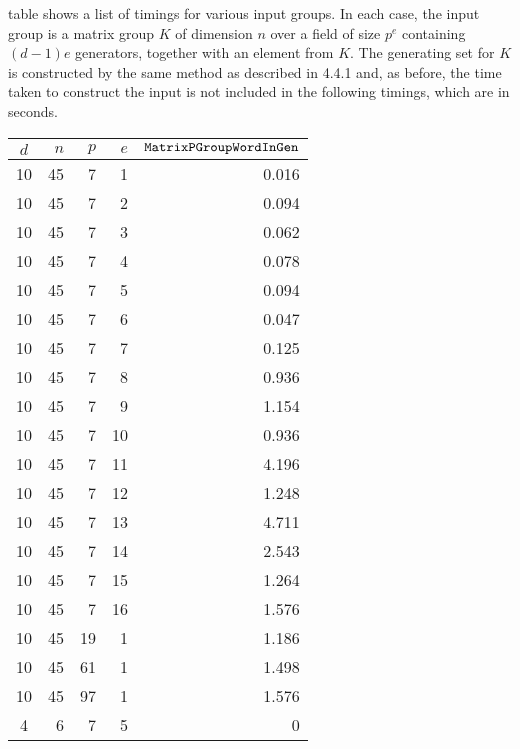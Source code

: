\documentclass[12pt]{report}
\begin{document}
\subsectionng table shows a list of timings for various input groups. In each case, the input group is a matrix group $K$ of dimension $n$ over a field of size $p^e$ containing $(d-1)e$ generators, together with an element from $K$. The generating set for $K$ is constructed by the same method as described in 4.4.1 and, as before, the time taken to construct the input is not included in the following timings, which are in seconds.

\begin{table}[htp]
\label{ruth}
\begin{center}
\begin{tabular}
{|c|r|r|r|r|} \hline
$d$ & $n$ & $p$ & $e$ & ${\tt MatrixPGroupWordInGen}$ \rule{0cm}{2.5ex}\\ \hline
10	&	45	&	7	&	1	&	0.016	\rule{0cm}{2.5ex}\\ \hline
10	&	45	&	7	&	2	&	0.094	\rule{0cm}{2.5ex}\\ \hline
10	&	45	&	7	&	3	&	0.062	\rule{0cm}{2.5ex}\\ \hline
10	&	45	&	7	&	4	&	0.078	\rule{0cm}{2.5ex}\\ \hline
10	&	45	&	7	&	5	&	0.094	\rule{0cm}{2.5ex}\\ \hline
10	&	45	&	7	&	6	&	0.047	\rule{0cm}{2.5ex}\\ \hline
10	&	45	&	7	&	7	&	0.125	\rule{0cm}{2.5ex}\\ \hline
10	&	45	&	7	&	8	&	0.936	\rule{0cm}{2.5ex}\\ \hline
10	&	45	&	7	&	9	&	1.154	\rule{0cm}{2.5ex}\\ \hline
10	&	45	&	7	&	10	&	0.936	\rule{0cm}{2.5ex}\\ \hline
10	&	45	&	7	&	11	&	4.196	\rule{0cm}{2.5ex}\\ \hline
10	&	45	&	7	&	12	&	1.248	\rule{0cm}{2.5ex}\\ \hline
10	&	45	&	7	&	13	&	4.711	\rule{0cm}{2.5ex}\\ \hline
10	&	45	&	7	&	14	&	2.543	\rule{0cm}{2.5ex}\\ \hline
10	&	45	&	7	&	15	&	1.264	\rule{0cm}{2.5ex}\\ \hline
10	&	45	&	7	&	16	&	1.576	\rule{0cm}{2.5ex}\\ \hline
10	&	45	&	19	&	1	&	1.186	\rule{0cm}{2.5ex}\\ \hline
10	&	45	&	61	&	1	&	1.498	\rule{0cm}{2.5ex}\\ \hline
10	&	45	&	97	&	1	&	1.576	\rule{0cm}{2.5ex}\\ \hline
4	&	6	&	7	&	5	&	0	\rule{0cm}{2.5ex}\\ \hline

\end{tabular}
\end{center}
\end{table}
\end{document}

